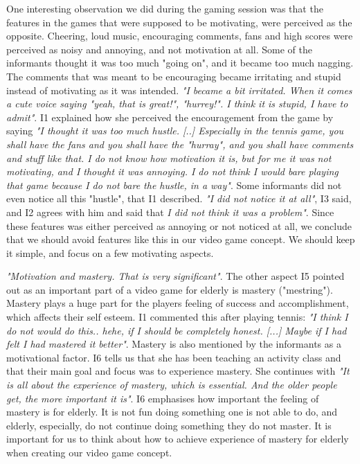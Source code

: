 One interesting observation we did during the gaming session was that the features in the games that were supposed to be motivating, were perceived as the opposite. Cheering, loud music, encouraging comments, fans and high scores were perceived as noisy and annoying, and not motivation at all. Some of the informants thought it was too much "going on", and it became too much nagging. The comments that was meant to be encouraging became irritating and stupid instead of motivating as it was intended. \emph{"I became a bit irritated. When it comes a cute voice saying "yeah, that is great!", "hurrey!". I think it is stupid, I have to admit"}.  I1 explained how she perceived the encouragement from the game by saying \emph{"I thought it was too much hustle. [..] Especially in the tennis game, you shall have the fans and you shall have the "hurray", and you shall have comments and stuff like that. I do not know how motivation it is, but for me it was not motivating, and I thought it was annoying. I do not think I would bare playing that game because I do not bare the hustle, in a way"}. Some informants did not even notice all this "hustle", that I1 described. \emph{"I did not notice it at all"}, I3 said, and I2 agrees with him and said that \emph{I did not think it was a problem"}. Since these features was either perceived as annoying or not noticed at all, we conclude that we should avoid features like this in our video game concept. We should keep it simple, and focus on a few motivating aspects. 

\emph{"Motivation and mastery. That is very significant"}. The other aspect I5 pointed out as an important part of a video game for elderly is mastery ("mestring"). Mastery plays a huge part for the players feeling of success and accomplishment, which affects their self esteem. I1 commented this after playing tennis: \emph{"I think I do not would do this.. hehe, if I should be completely honest. [...] Maybe if I had felt I had mastered it better"}. Mastery is also mentioned by the informants as a motivational factor. I6 tells us that she has been teaching an activity class and that their main goal and focus was to experience mastery. She continues with \emph{"It is all about the experience of mastery, which is essential. And the older people get, the more important it is"}. I6 emphasises how important the feeling of mastery is for elderly. It is not fun doing something one is not able to do, and elderly, especially, do not continue doing something they do not master. It is important for us to think about how to achieve experience of mastery for elderly when creating our video game concept. 

